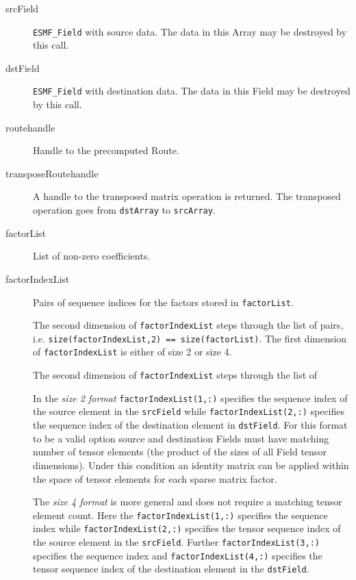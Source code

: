    \begin{description}
  
   \item [srcField]
         {\tt ESMF\_Field} with source data. The data in this Array may be
       destroyed by this call.
  
   \item [dstField]
         {\tt ESMF\_Field} with destination data. The data in this Field may be
       destroyed by this call.
  
   \item [routehandle]
         Handle to the precomputed Route.
  
   \item [transposeRoutehandle]
       A handle to the transposed matrix operation is returned. The
       transposed operation goes from {\tt dstArray} to {\tt srcArray}.
  
   \item [factorList]
         List of non-zero coefficients.
  
   \item [factorIndexList]
       Pairs of sequence indices for the factors stored in {\tt factorList}.
  
       \begin{sloppypar}
       The second dimension of {\tt factorIndexList} steps through the list of
       pairs, i.e. {\tt size(factorIndexList,2) == size(factorList)}. The first
       dimension of {\tt factorIndexList} is either of size 2 or size 4.
       \end{sloppypar}
       The second dimension of {\tt factorIndexList} steps through the list of
  
       In the {\em size 2 format} {\tt factorIndexList(1,:)} specifies the
       sequence index of the source element in the {\tt srcField} while
       {\tt factorIndexList(2,:)} specifies the sequence index of the
       destination element in {\tt dstField}. For this format to be a valid
       option source and destination Fields must have matching number of
       tensor elements (the product of the sizes of all Field tensor dimensions).
       Under this condition an identity matrix can be applied within the space of
       tensor elements for each sparse matrix factor.
  
       \begin{sloppypar}
       The {\em size 4 format} is more general and does not require a matching
       tensor element count. Here the {\tt factorIndexList(1,:)} specifies the
       sequence index while {\tt factorIndexList(2,:)} specifies the tensor
       sequence index of the source element in the {\tt srcField}. Further
       {\tt factorIndexList(3,:)} specifies the sequence index and
       {\tt factorIndexList(4,:)} specifies the tensor sequence index of the 
       destination element in the {\tt dstField}.
       \end{sloppypar}
  

\end{description}
